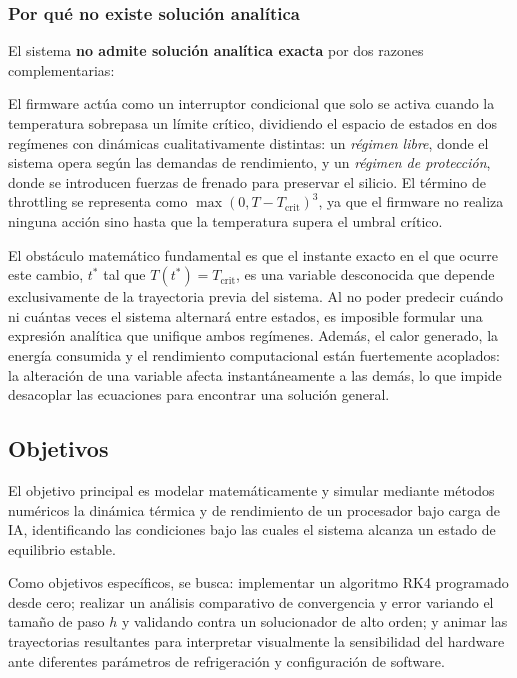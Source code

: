 \documentclass[10pt, twocolumn]{article}
\begin{document}
\subsubsection{Por qué no existe solución analítica}

El sistema \textbf{no admite solución analítica exacta} por dos razones
complementarias:

El firmware actúa como un interruptor condicional que solo se activa cuando la
temperatura sobrepasa un límite crítico, dividiendo el espacio de estados en dos
regímenes con dinámicas cualitativamente distintas: un \emph{régimen libre}, donde
el sistema opera según las demandas de rendimiento, y un \emph{régimen de
protección}, donde se introducen fuerzas de frenado para preservar el silicio.
El término de throttling se representa como $\max(0, T - T_{\text{crit}})^3$,
ya que el firmware no realiza ninguna acción sino hasta que la temperatura supera
el umbral crítico.

El obstáculo matemático fundamental es que el instante exacto en el que ocurre
este cambio, $t^*$ tal que $T(t^*) = T_{\text{crit}}$, es una variable desconocida
que depende exclusivamente de la trayectoria previa del sistema. Al no poder
predecir cuándo ni cuántas veces el sistema alternará entre estados, es imposible
formular una expresión analítica que unifique ambos regímenes. Además, el calor
generado, la energía consumida y el rendimiento computacional están fuertemente
acoplados: la alteración de una variable afecta instantáneamente a las demás, lo
que impide desacoplar las ecuaciones para encontrar una solución general.

\subsection{Objetivos}

El objetivo principal es modelar matemáticamente y simular mediante métodos
numéricos la dinámica térmica y de rendimiento de un procesador bajo carga de IA,
identificando las condiciones bajo las cuales el sistema alcanza un estado de
equilibrio estable.

Como objetivos específicos, se busca: implementar un algoritmo RK4 programado
desde cero; realizar un análisis comparativo de convergencia y error variando el
tamaño de paso $h$ y validando contra un solucionador de alto orden; y animar las
trayectorias resultantes para interpretar visualmente la sensibilidad del hardware
ante diferentes parámetros de refrigeración y configuración de software.
\end{document}
